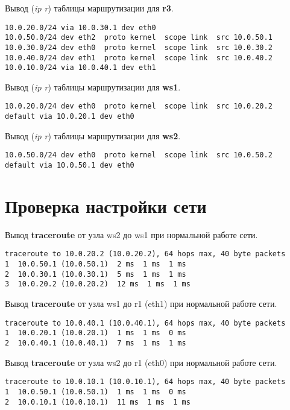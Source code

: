 \documentclass[a4paper,12pt]{article}
\begin{document}
Вывод (\textit{ip r}) таблицы маршрутизации для \textbf{r3}.

\begin{Verbatim}
10.0.20.0/24 via 10.0.30.1 dev eth0 
10.0.50.0/24 dev eth2  proto kernel  scope link  src 10.0.50.1 
10.0.30.0/24 dev eth0  proto kernel  scope link  src 10.0.30.2 
10.0.40.0/24 dev eth1  proto kernel  scope link  src 10.0.40.2 
10.0.10.0/24 via 10.0.40.1 dev eth1 
\end{Verbatim}

Вывод (\textit{ip r}) таблицы маршрутизации для \textbf{ws1}.

\begin{Verbatim}
10.0.20.0/24 dev eth0  proto kernel  scope link  src 10.0.20.2 
default via 10.0.20.1 dev eth0 
\end{Verbatim}

Вывод (\textit{ip r}) таблицы маршрутизации для \textbf{ws2}.

\begin{Verbatim}
10.0.50.0/24 dev eth0  proto kernel  scope link  src 10.0.50.2 
default via 10.0.50.1 dev eth0 
\end{Verbatim}

\section{Проверка настройки сети}

Вывод \textbf{traceroute} от узла ws2 до ws1 при нормальной работе сети.

\begin{Verbatim}
traceroute to 10.0.20.2 (10.0.20.2), 64 hops max, 40 byte packets
1  10.0.50.1 (10.0.50.1)  2 ms  1 ms  1 ms
2  10.0.30.1 (10.0.30.1)  5 ms  1 ms  1 ms
3  10.0.20.2 (10.0.20.2)  12 ms  1 ms  1 ms
\end{Verbatim}

Вывод \textbf{traceroute} от узла ws1 до r1 (eth1) при нормальной работе сети.

\begin{Verbatim}
traceroute to 10.0.40.1 (10.0.40.1), 64 hops max, 40 byte packets
1  10.0.20.1 (10.0.20.1)  1 ms  1 ms  0 ms
2  10.0.40.1 (10.0.40.1)  7 ms  1 ms  1 ms
\end{Verbatim}

Вывод \textbf{traceroute} от узла ws2 до r1 (eth0) при нормальной работе сети.

\begin{Verbatim}
traceroute to 10.0.10.1 (10.0.10.1), 64 hops max, 40 byte packets
1  10.0.50.1 (10.0.50.1)  1 ms  1 ms  0 ms
2  10.0.10.1 (10.0.10.1)  11 ms  1 ms  1 ms
\end{Verbatim}
\end{document}
